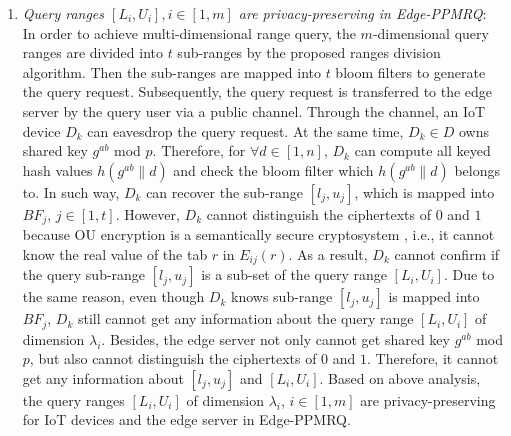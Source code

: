 \documentclass[IEEE JOURNAL OF BIOMEDICAL AND HEALTH INFORMATICS]{IEEEtran}
\begin{document}
\begin{enumerate}
	\item \emph{Query ranges $[L_i, U_i], i\in [1, m]$ are privacy-preserving in Edge-PPMRQ}:
	In order to achieve multi-dimensional range query, the $m$-dimensional query ranges are divided into $t$ sub-ranges by the proposed ranges division algorithm. Then the sub-ranges are mapped into $t$ bloom filters to generate the query request. Subsequently, the query request is transferred to the edge server by the query user via a public channel. Through the channel, an IoT device $D_k$ can eavesdrop the query request. At the same time, $D_k \in D$ owns shared key $g^{ab}$ mod $p$. Therefore, for $\forall d \in [1, n]$, $D_k$ can compute all keyed hash values $h(g^{ab} \| d)$ and check the bloom filter which $h(g^{ab} \| d)$ belongs to. In such way, $D_k$ can recover the sub-range $[l_j, u_j]$, which is mapped into $BF_j$, $j\in[1, t]$. However, $D_k$ cannot distinguish the ciphertexts of $0$ and $1$ because OU encryption is a semantically secure cryptosystem \cite{ou1998}, i.e., it cannot know the real value of the tab $r$ in $E_{ij}(r)$. As a result, $D_k$ cannot confirm if the query sub-range $[l_j, u_j]$ is a sub-set of the query range $[L_i, U_i]$. Due to the same reason, even though $D_k$ knows sub-range $[l_j, u_j]$ is mapped into $BF_j$, $D_k$ still cannot get any information about the query range $[L_i, U_i]$ of dimension $\lambda_i$. Besides, the edge server not only cannot get shared key $g^{ab}$ mod $p$, but also cannot distinguish the ciphertexts of $0$ and $1$. Therefore, it cannot get any information about $[l_j, u_j]$ and $[L_i, U_i]$. Based on above analysis, the query ranges $[L_i, U_i]$ of dimension $\lambda_i$, $i \in [1, m]$ are privacy-preserving for IoT devices and the edge server in Edge-PPMRQ.
	        

\end{enumerate}
\end{document}
